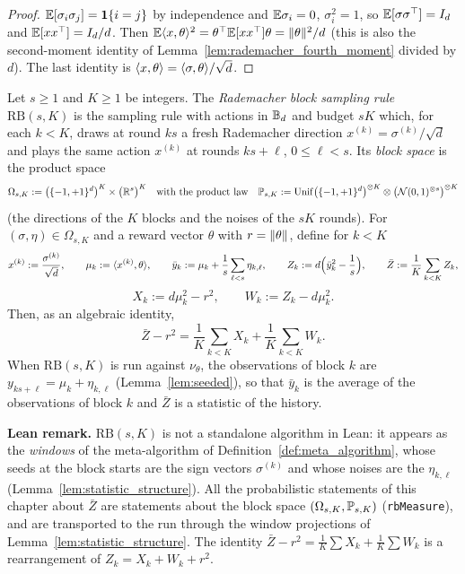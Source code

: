 \begin{proof}
\leanok
{}
$\mathbb{E}[\sigma_i\sigma_j] = \mathbf{1}\{i = j\}$ by independence and $\mathbb{E}\sigma_i = 0$,
$\sigma_i^2 = 1$, so $\mathbb{E}[\sigma\sigma^\top] = I_d$ and $\mathbb{E}[xx^\top] = I_d/d$. Then
$\mathbb{E}\langle x, \theta \rangle^2 = \theta^\top\mathbb{E}[xx^\top]\theta = \lVert \theta \rVert^2/d$ (this is also the
second-moment identity of Lemma~\ref{lem:rademacher_fourth_moment} divided by $d$). The last
identity is $\langle x, \theta \rangle = \langle \sigma, \theta \rangle/\sqrt d$.
\end{proof}

\begin{definition}\label{def:squared_statistic}
\leanok
{}
Let $s \ge 1$ and $K \ge 1$ be integers. The \emph{Rademacher block sampling rule}
$\mathrm{RB}(s, K)$ is the sampling rule with actions in $\mathbb{B}_d$ and budget $sK$ which, for
each $k < K$, draws at round $ks$ a fresh Rademacher direction $x^{(k)} = \sigma^{(k)}/\sqrt d$
and plays the same action $x^{(k)}$ at rounds $ks + \ell$, $0 \le \ell < s$. Its
\emph{block space} is the product space
\[
  \Omega_{s,K} := \big(\{-1,+1\}^d\big)^K \times \big(\mathbb{R}^s\big)^K
  \quad\text{with the product law}\quad
  \mathbb{P}_{s,K} := \mathrm{Unif}\big(\{-1,+1\}^d\big)^{\otimes K} \otimes
    \big(\mathcal{N}(0,1)^{\otimes s}\big)^{\otimes K}
\]
(the directions of the $K$ blocks and the noises of the $sK$ rounds). For
$(\sigma, \eta) \in \Omega_{s,K}$ and a reward vector $\theta$ with $r = \lVert \theta \rVert$, define
for $k < K$
\[
  x^{(k)} := \frac{\sigma^{(k)}}{\sqrt d}, \qquad
  \mu_k := \langle x^{(k)}, \theta \rangle, \qquad
  \bar y_k := \mu_k + \frac1s \sum_{\ell < s} \eta_{k,\ell}, \qquad
  Z_k := d\Big( \bar y_k^2 - \frac1s \Big), \qquad
  \bar Z := \frac1K \sum_{k<K} Z_k ,
\]
\[
  X_k := d\mu_k^2 - r^2, \qquad
  W_k := Z_k - d\mu_k^2 .
\]
Then, as an algebraic identity,
\[
  \bar Z - r^2 = \frac1K \sum_{k<K} X_k + \frac1K \sum_{k<K} W_k .
\]
When $\mathrm{RB}(s,K)$ is run against $\nu_\theta$, the observations of block $k$ are
$y_{ks+\ell} = \mu_k + \eta_{k,\ell}$ (Lemma~\ref{lem:seeded}), so that $\bar y_k$ is the
average of the observations of block $k$ and $\bar Z$ is a statistic of the history.
\end{definition}

\textbf{Lean remark.} $\mathrm{RB}(s,K)$ is not a standalone algorithm in Lean: it appears as
the \emph{windows} of the meta-algorithm of Definition~\ref{def:meta_algorithm}, whose seeds
at the block starts are the sign vectors $\sigma^{(k)}$ and whose noises are the
$\eta_{k,\ell}$ (Lemma~\ref{lem:statistic_structure}). All the probabilistic statements of
this chapter about $\bar Z$ are statements about the block space
$(\Omega_{s,K}, \mathbb{P}_{s,K})$ (\texttt{rbMeasure}), and are transported to the run through the
window projections of Lemma~\ref{lem:statistic_structure}. The identity
$\bar Z - r^2 = \frac1K\sum X_k + \frac1K\sum W_k$ is a rearrangement of
$Z_k = X_k + W_k + r^2$.


